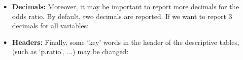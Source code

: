 \documentclass[11pt]{article}
\begin{document}
\begin{itemize}
\begin{itemize}
\newpage
	\item {\bf Decimals:} Moreover, it may be important to report more decimals for the odds ratio. By default, two decimals are reported. If we want to report 3 decimals for all variables:
\begin{center}
\end{center}

	\item {\bf Headers:} Finally, some `key' words in the header of the descriptive tables, (such as `p.ratio', ...) may be changed:
\begin{center}
\end{center}				

	\end{itemize}


\end{itemize}
\end{document}
